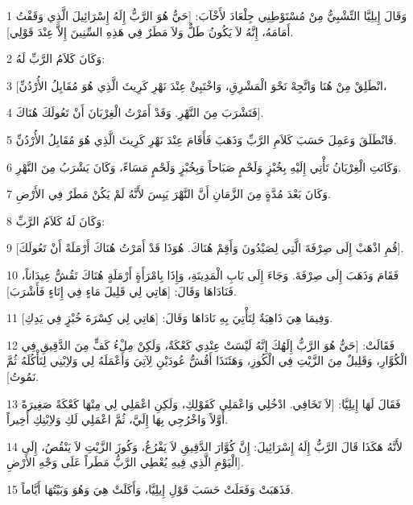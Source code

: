 \par 1 وَقَالَ إِيلِيَّا التِّشْبِيُّ مِنْ مُسْتَوْطِنِي جِلْعَادَ لأَخْآبَ: [حَيٌّ هُوَ الرَّبُّ إِلَهُ إِسْرَائِيلَ الَّذِي وَقَفْتُ أَمَامَهُ، إِنَّهُ لاَ يَكُونُ طَلٌّ وَلاَ مَطَرٌ فِي هَذِهِ السِّنِينَ إِلاَّ عِنْدَ قَوْلِي].
\par 2 وَكَانَ كَلاَمُ الرَّبِّ لَهُ:
\par 3 [انْطَلِقْ مِنْ هُنَا وَاتَّجِهْ نَحْوَ الْمَشْرِقِ، وَاخْتَبِئْ عِنْدَ نَهْرِ كَرِيثَ الَّذِي هُوَ مُقَابِلُ الأُرْدُنِّ،
\par 4 فَتَشْرَبَ مِنَ النَّهْرِ. وَقَدْ أَمَرْتُ الْغِرْبَانَ أَنْ تَعُولَكَ هُنَاكَ].
\par 5 فَانْطَلَقَ وَعَمِلَ حَسَبَ كَلاَمِ الرَّبِّ وَذَهَبَ فَأَقَامَ عِنْدَ نَهْرِ كَرِيثَ الَّذِي هُوَ مُقَابِلُ الأُرْدُنِّ.
\par 6 وَكَانَتِ الْغِرْبَانُ تَأْتِي إِلَيْهِ بِخُبْزٍ وَلَحْمٍ صَبَاحاً وَبِخُبْزٍ وَلَحْمٍ مَسَاءً، وَكَانَ يَشْرَبُ مِنَ النَّهْرِ.
\par 7 وَكَانَ بَعْدَ مُدَّةٍ مِنَ الزَّمَانِ أَنَّ النَّهْرَ يَبِسَ لأَنَّهُ لَمْ يَكُنْ مَطَرٌ فِي الأَرْضِ.
\par 8 وَكَانَ لَهُ كَلاَمُ الرَّبِّ:
\par 9 [قُمِ اذْهَبْ إِلَى صِرْفَةَ الَّتِي لِصَيْدُونَ وَأَقِمْ هُنَاكَ. هُوَذَا قَدْ أَمَرْتُ هُنَاكَ أَرْمَلَةً أَنْ تَعُولَكَ].
\par 10 فَقَامَ وَذَهَبَ إِلَى صِرْفَةَ. وَجَاءَ إِلَى بَابِ الْمَدِينَةِ، وَإِذَا بِامْرَأَةٍ أَرْمَلَةٍ هُنَاكَ تَقُشُّ عِيدَاناً، فَنَادَاهَا وَقَالَ: [هَاتِي لِي قَلِيلَ مَاءٍ فِي إِنَاءٍ فَأَشْرَبَ].
\par 11 وَفِيمَا هِيَ ذَاهِبَةٌ لِتَأْتِيَ بِهِ نَادَاهَا وَقَالَ: [هَاتِي لِي كِسْرَةَ خُبْزٍ فِي يَدِكِ].
\par 12 فَقَالَتْ: [حَيٌّ هُوَ الرَّبُّ إِلَهُكَ إِنَّهُ لَيْسَتْ عِنْدِي كَعْكَةٌ، وَلَكِنْ مِلْءُ كَفٍّ مِنَ الدَّقِيقِ فِي الْكُوَّارِ، وَقَلِيلٌ مِنَ الزَّيْتِ فِي الْكُوزِ، وَهَئَنَذَا أَقُشُّ عُودَيْنِ لِآتِيَ وَأَعْمَلَهُ لِي وَلاِبْنِي لِنَأْكُلَهُ ثُمَّ نَمُوتُ].
\par 13 فَقَالَ لَهَا إِيلِيَّا: [لاَ تَخَافِي. ادْخُلِي وَاعْمَلِي كَقَوْلِكِ، وَلَكِنِ اعْمَلِي لِي مِنْهَا كَعْكَةً صَغِيرَةً أَوَّلاً وَاخْرُجِي بِهَا إِلَيَّ، ثُمَّ اعْمَلِي لَكِ وَلاِبْنِكِ أَخِيراً.
\par 14 لأَنَّهُ هَكَذَا قَالَ الرَّبُّ إِلَهُ إِسْرَائِيلَ: إِنَّ كُوَّارَ الدَّقِيقِ لاَ يَفْرُغُ، وَكُوزَ الزَّيْتِ لاَ يَنْقُصُ، إِلَى الْيَوْمِ الَّذِي فِيهِ يُعْطِي الرَّبُّ مَطَراً عَلَى وَجْهِ الأَرْضِ].
\par 15 فَذَهَبَتْ وَفَعَلَتْ حَسَبَ قَوْلِ إِيلِيَّا، وَأَكَلَتْ هِيَ وَهُوَ وَبَيْتُهَا أَيَّاماً.
